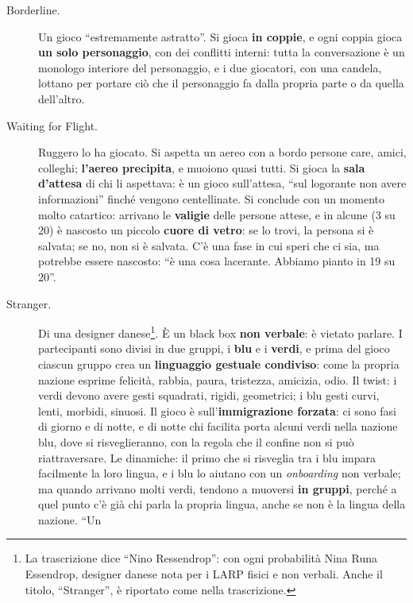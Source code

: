 \begin{description}
  \item[Borderline.] Un gioco ``estremamente astratto''. Si gioca \textbf{in
        coppie}, e ogni coppia gioca \textbf{un solo personaggio}, con dei
        conflitti interni: tutta la conversazione è un monologo interiore del
        personaggio, e i due giocatori, con una candela, lottano per portare ciò
        che il personaggio fa dalla propria parte o da quella dell'altro.
  \item[Waiting for Flight.] Ruggero lo ha giocato. Si aspetta un aereo con a
        bordo persone care, amici, colleghi; \textbf{l'aereo precipita}, e
        muoiono quasi tutti. Si gioca la \textbf{sala d'attesa} di chi li
        aspettava: è un gioco sull'attesa, ``sul logorante non avere
        informazioni'' finché vengono centellinate. Si conclude con un momento
        molto catartico: arrivano le \textbf{valigie} delle persone attese, e in
        alcune (3 su 20) è nascosto un piccolo \textbf{cuore di vetro}: se lo
        trovi, la persona si è salvata; se no, non si è salvata. C'è una fase in
        cui speri che ci sia, ma potrebbe essere nascosto: ``è una cosa
        lacerante. Abbiamo pianto in 19 su 20''.
  \item[Stranger.] Di una designer danese\footnote{La trascrizione dice ``Nino
        Ressendrop'': con ogni probabilità Nina Runa Essendrop, designer danese
        nota per i LARP fisici e non verbali. Anche il titolo, ``Stranger'', è
        riportato come nella trascrizione.}. È un black box \textbf{non verbale}:
        è vietato parlare. I partecipanti sono divisi in due gruppi, i
        \textbf{blu} e i \textbf{verdi}, e prima del gioco ciascun gruppo crea un
        \textbf{linguaggio gestuale condiviso}: come la propria nazione esprime
        felicità, rabbia, paura, tristezza, amicizia, odio. Il twist: i verdi
        devono avere gesti squadrati, rigidi, geometrici; i blu gesti curvi,
        lenti, morbidi, sinuosi. Il gioco è sull'\textbf{immigrazione forzata}:
        ci sono fasi di giorno e di notte, e di notte chi facilita porta alcuni
        verdi nella nazione blu, dove si risveglieranno, con la regola che il
        confine non si può riattraversare. Le dinamiche: il primo che si
        risveglia tra i blu impara facilmente la loro lingua, e i blu lo aiutano
        con un \emph{onboarding} non verbale; ma quando arrivano molti verdi,
        tendono a muoversi \textbf{in gruppi}, perché a quel punto c'è già chi
        parla la propria lingua, anche se non è la lingua della nazione. ``Un

\end{description}
